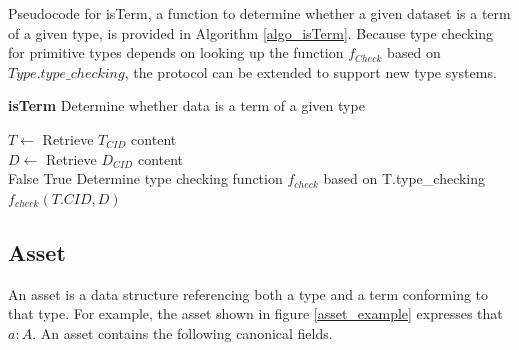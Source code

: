 \documentclass[9pt, oneside]{article}   	%
\begin{document}
\begin{multicols}{2}

Pseudocode for isTerm, a function to determine whether a given dataset is a term of a given type, is provided in Algorithm \ref{algo_isTerm}. Because type checking for primitive types depends on looking up the function $f_{Check}$ based on $Type.type\_checking$, the protocol can be extended to support new type systems.

     
\begin{algorithm}[H]
\caption{\textbf{isTerm} Determine whether data is a term of a given type}
\label{algo_isTerm}
\label{alg:quad}
    \SetAlgoLined
$T \gets$ Retrieve $T_{CID}$ content\\
$D \gets$ Retrieve $D_{CID}$ content\\ 
{
	{
		\Return False
	}
    \Return True
    }{
    Determine type checking function $f_{check}$ based on T.type\_checking\\
    \Return $f_{check}(T.CID, D)$
}
\end{algorithm}

\subsection{Asset}\label{type}

An asset is a data structure referencing both a type and a term conforming to that type. For example, the asset shown in figure \ref{asset_example} expresses that $a : A$. An asset contains the following canonical fields.


\end{multicols}
\end{document}
